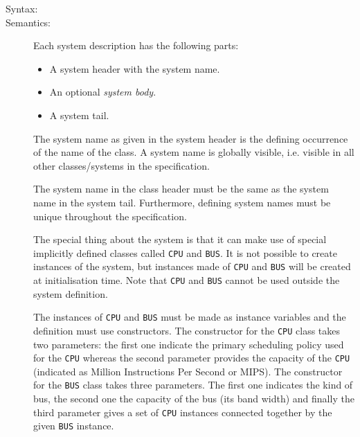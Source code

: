 \documentclass[\pformat,12pt]{article}
\begin{document}
\begin{description}
\item[Syntax:] 

\item[Semantics:] Each system description has the following parts:
\begin{itemize}
\item A system header with the system name.
\item An optional {\em system body}.
\item A system tail.
\end{itemize}

The system name as given in the system header is the defining occurrence
of the name of the class. A system name is globally visible, i.e. visible
in all other classes/systems in the specification.

The system name in the class header must be the same as the system
name in the system tail.  Furthermore, defining system names must be unique
throughout the specification.

The special thing about the system is that it can make use of special
implicitly defined classes called \texttt{CPU} and \texttt{BUS}. It is 
not possible to create instances of the system, but instances made of
\texttt{CPU} and \texttt{BUS} will be created at initialisation time. 
Note that \texttt{CPU} and \texttt{BUS} cannot be used outside the
system definition.

The instances of \texttt{CPU} and \texttt{BUS} must be made as instance 
variables and the definition must use constructors. The constructor for the
\texttt{CPU} class takes two parameters: the first one indicate the 
primary scheduling policy used for the \texttt{CPU} whereas the second 
parameter provides the capacity of the \texttt{CPU} (indicated as Million
Instructions Per Second or MIPS). The constructor for the \texttt{BUS}
class takes three parameters. The first one indicates the kind of bus, the
second one the capacity of the bus (its band width) and finally the third 
parameter gives a set of \texttt{CPU} instances connected together by the
given \texttt{BUS} instance.


\end{description}
\end{document}
